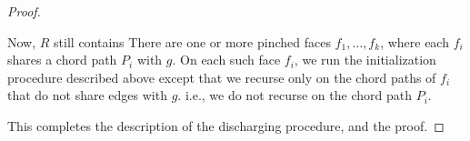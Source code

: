 \documentclass{patmorin}
\begin{document}
\begin{proof}
\begin{enumerate}
  Now, $R$ still contains There are one or more pinched faces
  $f_1,\ldots,f_k$, where each $f_i$ shares a chord path $P_i$ with $g$.
  On each such face $f_i$, we run the initialization procedure described
  above except that we recurse only on the chord paths of $f_i$ that
  do not share edges with $g$. i.e., we do not recurse on the chord
  path $P_i$.
\end{enumerate}
   This completes the description of the discharging procedure, and the proof.
\end{proof}



\end{document}
